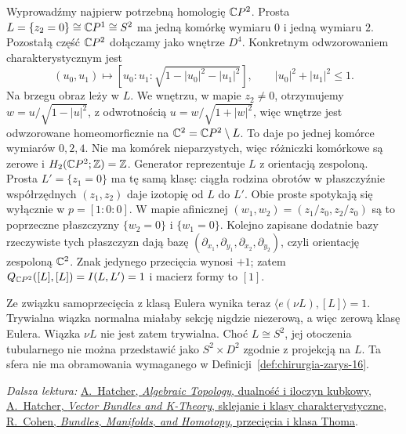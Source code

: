 \begin{przyklad}
\label{prz:cp2-forma-21}
Wyprowadźmy najpierw potrzebną homologię $\mathbb{C} P^2$.
Prosta $L=\{z_2=0\}\cong\mathbb{C} P^1\cong S^2$
ma jedną komórkę wymiaru $0$ i jedną wymiaru $2$.
Pozostałą część $\mathbb{C} P^2$ dołączamy jako wnętrze $D^4$.
Konkretnym odwzorowaniem charakterystycznym jest
\[
 (u_0,u_1)\longmapsto
 [u_0:u_1:\sqrt{1-|u_0|^2-|u_1|^2}],
 \qquad |u_0|^2+|u_1|^2\leq1.
\]
Na brzegu obraz leży w $L$. We wnętrzu, w mapie $z_2\ne0$,
otrzymujemy $w=u/\sqrt{1-|u|^2}$, z odwrotnością
$u=w/\sqrt{1+|w|^2}$, więc wnętrze jest odwzorowane
homeomorficznie na $\mathbb{C}^2=\mathbb{C} P^2\setminus L$.
To daje po jednej komórce wymiarów $0,2,4$.
Nie ma komórek nieparzystych,
więc różniczki komórkowe są zerowe i $H_2(\mathbb{C} P^2;\mathbb{Z})=\mathbb{Z}$.
Generator reprezentuje $L$ z orientacją zespoloną.
Prosta $L'=\{z_1=0\}$ ma tę samą klasę:
ciągła rodzina obrotów w płaszczyźnie współrzędnych
$(z_1,z_2)$ daje izotopię od $L$ do $L'$.
Obie proste spotykają się wyłącznie w $p=[1:0:0]$.
W mapie afinicznej $(w_1,w_2)=(z_1/z_0,z_2/z_0)$
są to poprzeczne płaszczyzny $\{w_2=0\}$ i $\{w_1=0\}$.
Kolejno zapisane dodatnie bazy rzeczywiste tych
płaszczyzn dają bazę
$(\partial_{x_1},\partial_{y_1},\partial_{x_2},\partial_{y_2})$,
czyli orientację zespoloną $\mathbb{C}^2$.
Znak jedynego przecięcia wynosi $+1$; zatem
$Q_{\mathbb{C} P^2}([L],[L])=I(L,L')=1$ i macierz formy to $[1]$.

Ze związku samoprzecięcia z klasą Eulera wynika teraz
$\langle e(\nu L),[L]\rangle=1$.
Trywialna wiązka normalna miałaby sekcję nigdzie niezerową,
a więc zerową klasę Eulera. Wiązka $\nu L$ nie jest zatem
trywialna. Choć $L\cong S^2$, jej otoczenia tubularnego
nie można przedstawić jako $S^2\times D^2$ zgodnie
z projekcją na $L$. Ta sfera nie ma obramowania
wymaganego w Definicji~\ref{def:chirurgia-zarys-16}.
\end{przyklad}

\par\smallskip
{\footnotesize\noindent\emph{Dalsza lektura:}
\href{https://pi.math.cornell.edu/~hatcher/AT/AT.pdf}{A.\ Hatcher, \emph{Algebraic Topology}, dualność i iloczyn kubkowy},
\href{https://pi.math.cornell.edu/~hatcher/VBKT/VB.pdf}{A.\ Hatcher, \emph{Vector Bundles and K-Theory}, sklejanie i klasy charakterystyczne},
\href{https://math.stanford.edu/~ralph/bookR4.pdf}{R.\ Cohen, \emph{Bundles, Manifolds, and Homotopy}, przecięcia i klasa Thoma}.\par}
